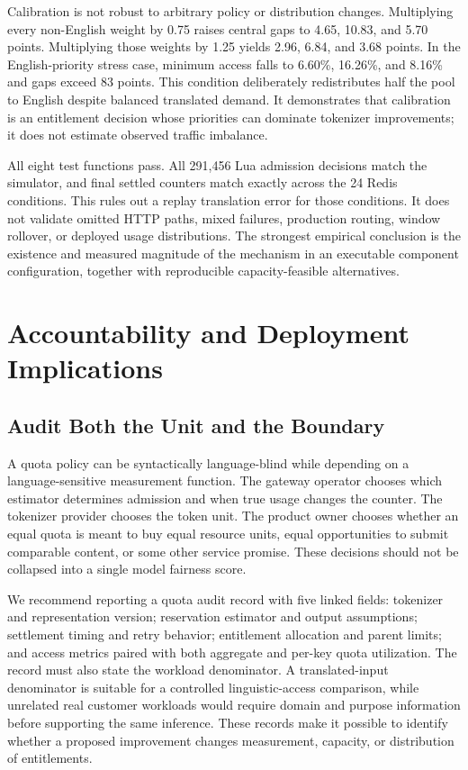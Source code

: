 \documentclass[manuscript,screen]{acmart}
\begin{document}
Calibration is not robust to arbitrary policy or distribution changes. Multiplying every non-English weight by 0.75 raises central gaps to 4.65, 10.83, and 5.70 points. Multiplying those weights by 1.25 yields 2.96, 6.84, and 3.68 points. In the English-priority stress case, minimum access falls to 6.60\%, 16.26\%, and 8.16\% and gaps exceed 83 points. This condition deliberately redistributes half the pool to English despite balanced translated demand. It demonstrates that calibration is an entitlement decision whose priorities can dominate tokenizer improvements; it does not estimate observed traffic imbalance.

All eight test functions pass. All 291,456 Lua admission decisions match the simulator, and final settled counters match exactly across the 24 Redis conditions. This rules out a replay translation error for those conditions. It does not validate omitted HTTP paths, mixed failures, production routing, window rollover, or deployed usage distributions. The strongest empirical conclusion is the existence and measured magnitude of the mechanism in an executable component configuration, together with reproducible capacity-feasible alternatives.

\section{Accountability and Deployment Implications}
\subsection{Audit Both the Unit and the Boundary}
A quota policy can be syntactically language-blind while depending on a language-sensitive measurement function. The gateway operator chooses which estimator determines admission and when true usage changes the counter. The tokenizer provider chooses the token unit. The product owner chooses whether an equal quota is meant to buy equal resource units, equal opportunities to submit comparable content, or some other service promise. These decisions should not be collapsed into a single model fairness score.

We recommend reporting a quota audit record with five linked fields: tokenizer and representation version; reservation estimator and output assumptions; settlement timing and retry behavior; entitlement allocation and parent limits; and access metrics paired with both aggregate and per-key quota utilization. The record must also state the workload denominator. A translated-input denominator is suitable for a controlled linguistic-access comparison, while unrelated real customer workloads would require domain and purpose information before supporting the same inference. These records make it possible to identify whether a proposed improvement changes measurement, capacity, or distribution of entitlements.
\end{document}
